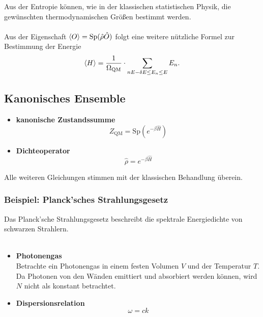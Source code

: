 \documentclass{article}
\newcommand{\lr}[1]{\left(#1\right)}
\begin{document}
Aus der Entropie können, wie in der klassischen statistischen Physik, die gewünschten thermodynamischen Größen bestimmt werden.\\\\
Aus der Eigenschaft $\braket{O} = \text{Sp}(\hat{\rho}\hat{O})$ folgt eine weitere nützliche Formel zur Bestimmung der Energie
	\begin{equation}
		\braket{H} = \frac{1}{\Omega_\text{QM}} \cdot \sum_{n\\ E-\delta E \leq E_n \leq E} E_n.
	\end{equation}


\subsection{Kanonisches Ensemble}
	\begin{itemize}
		\item \textbf{kanonische Zustandssumme}
			\begin{equation}
				Z_\text{QM} = \text{Sp} \lr{ e^{-\beta \hat{H}} }
			\end{equation}
		
		
		\item \textbf{Dichteoperator}
			\begin{equation}
				\hat{\rho} = e^{-\beta \hat{H}}
			\end{equation}
	\end{itemize}

Alle weiteren Gleichungen stimmen mit der klassischen Behandlung überein.

\newpage


\subsubsection{Beispiel: Planck'sches Strahlungsgesetz}
Das Planck'sche Strahlungsgesetz beschreibt die spektrale Energiedichte von schwarzen Strahlern.\\
\\
	\begin{itemize}
		\item \textbf{Photonengas}\\
		Betrachte ein Photonengas in einem festen Volumen $V$ und der Temperatur $T$.\\
Da Photonen von den Wänden emittiert und absorbiert werden können, wird $N$ nicht als konstant betrachtet.
		
		
		\item \textbf{Dispersionsrelation}
			\begin{equation}
				\omega = c k
			\end{equation}
	\end{itemize}
\end{document}
